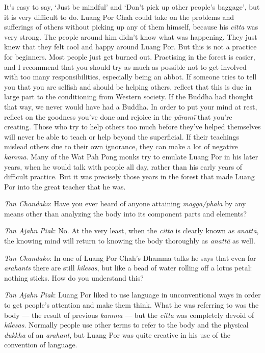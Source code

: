 It's easy to say, `Just be mindful' and `Don't pick up other people's
baggage', but it is very difficult to do. Luang Por Chah could take on
the problems and sufferings of others without picking up any of them
himself, because his \emph{citta} was very strong. The people around him
didn't know what was happening. They just knew that they felt cool and
happy around Luang Por. But this is not a practice for beginners. Most
people just get burned out. Practising in the forest is easier, and I
recommend that you should try as much as possible not to get involved
with too many responsibilities, especially being an abbot. If someone
tries to tell you that you are selfish and should be helping others,
reflect that this is due in large part to the conditioning from Western
society. If the Buddha had thought that way, we never would have had a
Buddha. In order to put your mind at rest, reflect on the goodness
you've done and rejoice in the \emph{pāramī} that you're creating. Those
who try to help others too much before they've helped themselves will
never be able to teach or help beyond the superficial. If their
teachings mislead others due to their own ignorance, they can make a lot
of negative \emph{kamma}. Many of the Wat Pah Pong monks try to emulate
Luang Por in his later years, when he would talk with people all day,
rather than his early years of difficult practice. But it was precisely
those years in the forest that made Luang Por into the great teacher
that he was.

\emph{Tan Chandako}: Have you ever heard of anyone attaining
\emph{magga/phala} by any means other than analyzing the body into its
component parts and elements?

\emph{Tan Ajahn Piak}: No. At the very least, when the \emph{citta} is
clearly known as \emph{anattā}, the knowing mind will return to knowing
the body thoroughly as \emph{anattā} as well.

\emph{Tan Chandako}: In one of Luang Por Chah's Dhamma talks he says
that even for \emph{arahants} there are still \emph{kilesas}, but like a
bead of water rolling off a lotus petal: nothing sticks. How do you
understand this?

\emph{Tan Ajahn Piak}: Luang Por liked to use language in unconventional
ways in order to get people's attention and make them think. What he was
referring to was the body --- the result of previous \emph{kamma} ---
but the \emph{citta} was completely devoid of \emph{kilesas}. Normally
people use other terms to refer to the body and the physical
\emph{dukkha} of an \emph{arahant}, but Luang Por was quite creative in
his use of the convention of language.

